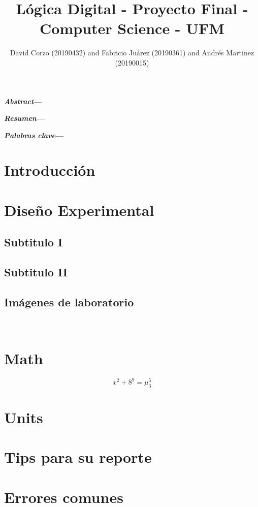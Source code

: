 \documentclass{proc}
\title{Lógica Digital - Proyecto Final - Computer Science - UFM}
\author{David Corzo (20190432) and Fabricio Juárez (20190361) and Andrés Martinez (20190015)}
\date{}
\begin{document}
\maketitle


\indent\emph{\textbf{Abstract}}\textbf{—}
\newline

\emph{\textbf{Resumen}}\textbf{—  }
\newline

\emph{\textbf{Palabras clave}}\textbf{— }
\newline

\section{Introducción}

\appendix	
\section{Diseño Experimental}
\subsection{Subtitulo I}
\subsection{Subtitulo II}
\subsection{Imágenes de laboratorio}
\

\section{Math}
\begin{equation}
x^2+8^9=\mu_3^5
\end{equation}

\section{Units}

\section{Tips para su reporte}

\section{Errores comunes}
\end{document}
